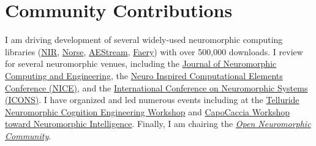 \documentclass[11pt, a4paper]{article}
\newcommand{\years}[1]{\marginnote{\scriptsize #1}}
\begin{document}
\section*{Community Contributions}
I am driving development of several widely-used neuromorphic computing libraries (\href{https://github.com/neuromorphs/NIR}{NIR}, \href{https://github.com/norse/}{Norse}, \href{https://github.com/aestream}{AEStream}, \href{https://github.com/aestream/faery}{Faery}) with over 500,000 downloads.
I review for several neuromorphic venues, including the \href{https://iopscience.iop.org/journal/2634-4386}{Journal of Neuromorphic Computing and Engineering}, the \href{https://niceworkshop.org/}{Neuro Inspired Computational Elements Conference (NICE)}, and the \href{https://iconsneuromorphic.cc/}{International Conference on Neuromorphic Systems (ICONS)}.
I have organized and led numerous events including at the \href{https://sites.google.com/view/telluride-2024/}{Telluride Neuromorphic Cognition Engineering Workshop} and \href{https://capocaccia.cc/en/}{CapoCaccia Workshop toward Neuromorphic Intelligence}.
Finally, I am chairing the \emph{\href{https://open-neuromorphic.org/}{Open Neuromorphic Community}}.
\end{document}
